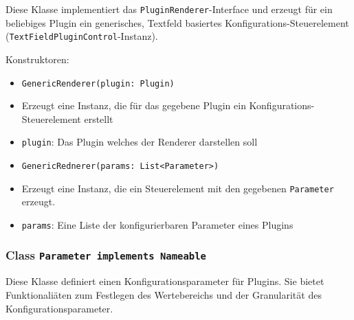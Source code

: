 \documentclass[parskip=full,11pt]{scrartcl}
\begin{document}
Diese Klasse implementiert das \texttt{PluginRenderer}-Interface und erzeugt für ein beliebiges Plugin ein generisches, Textfeld basiertes Konfigurations-Steuerelement (\texttt{TextFieldPluginControl}-Instanz).

Konstruktoren:

\begin{itemize}\itemsep -10pt
	\item \texttt{GenericRenderer(plugin: Plugin)}
	\item[] Erzeugt eine Instanz, die für das gegebene Plugin ein Konfigurations-Steuerelement erstellt
	\item[] \texttt{plugin}: Das Plugin welches der Renderer darstellen soll
	\item \texttt{GenericRednerer(params: List<Parameter>)}
	\item[] Erzeugt eine Instanz, die ein Steuerelement mit den gegebenen \texttt{Parameter} erzeugt.
	\item[] \texttt{params}: Eine Liste der konfigurierbaren Parameter eines Plugins
\end{itemize} 

\subsubsection{Class \texttt{Parameter implements Nameable}}

Diese Klasse definiert einen Konfigurationsparameter für Plugins. Sie bietet Funktionaliäten zum Festlegen des Wertebereichs und der Granularität des Konfigurationsparameter.
\end{document}
